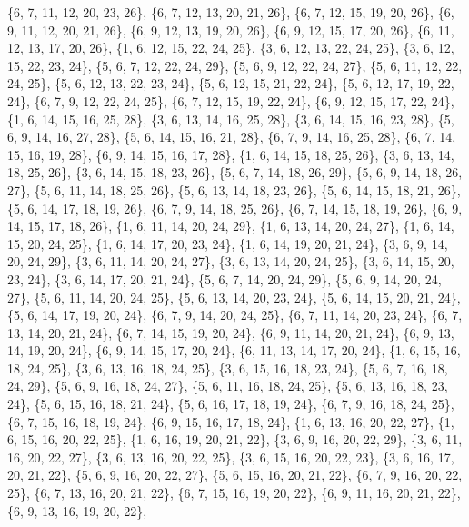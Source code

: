 \documentclass[11pt,a4paper]{article}
\begin{document}
{\{6, 7, 11, 12, 20, 23, 26\}, \{6, 7, 12, 13, 20, 21, 26\}, \{6, 7, 12, 15, 19, 20, 26\}, \{6, 9, 11, 12, 20, 21, 26\}, \{6, 9, 12, 13, 19, 20, 26\},
\{6, 9, 12, 15, 17, 20, 26\}, \{6, 11, 12, 13, 17, 20, 26\}, \{1, 6, 12, 15, 22, 24, 25\}, \{3, 6, 12, 13, 22, 24, 25\}, \{3, 6, 12, 15, 22, 23, 24\},
\{5, 6, 7, 12, 22, 24, 29\}, \{5, 6, 9, 12, 22, 24, 27\}, \{5, 6, 11, 12, 22, 24, 25\}, \{5, 6, 12, 13, 22, 23, 24\}, \{5, 6, 12, 15, 21, 22, 24\},
\{5, 6, 12, 17, 19, 22, 24\}, \{6, 7, 9, 12, 22, 24, 25\}, \{6, 7, 12, 15, 19, 22, 24\}, \{6, 9, 12, 15, 17, 22, 24\}, \{1, 6, 14, 15, 16, 25, 28\},
\{3, 6, 13, 14, 16, 25, 28\}, \{3, 6, 14, 15, 16, 23, 28\}, \{5, 6, 9, 14, 16, 27, 28\}, \{5, 6, 14, 15, 16, 21, 28\}, \{6, 7, 9, 14, 16, 25, 28\},
\{6, 7, 14, 15, 16, 19, 28\}, \{6, 9, 14, 15, 16, 17, 28\}, \{1, 6, 14, 15, 18, 25, 26\}, \{3, 6, 13, 14, 18, 25, 26\}, \{3, 6, 14, 15, 18, 23, 26\},
\{5, 6, 7, 14, 18, 26, 29\}, \{5, 6, 9, 14, 18, 26, 27\}, \{5, 6, 11, 14, 18, 25, 26\}, \{5, 6, 13, 14, 18, 23, 26\}, \{5, 6, 14, 15, 18, 21, 26\},
\{5, 6, 14, 17, 18, 19, 26\}, \{6, 7, 9, 14, 18, 25, 26\}, \{6, 7, 14, 15, 18, 19, 26\}, \{6, 9, 14, 15, 17, 18, 26\}, \{1, 6, 11, 14, 20, 24, 29\},
\{1, 6, 13, 14, 20, 24, 27\}, \{1, 6, 14, 15, 20, 24, 25\}, \{1, 6, 14, 17, 20, 23, 24\}, \{1, 6, 14, 19, 20, 21, 24\}, \{3, 6, 9, 14, 20, 24, 29\},
\{3, 6, 11, 14, 20, 24, 27\}, \{3, 6, 13, 14, 20, 24, 25\}, \{3, 6, 14, 15, 20, 23, 24\}, \{3, 6, 14, 17, 20, 21, 24\}, \{5, 6, 7, 14, 20, 24, 29\},
\{5, 6, 9, 14, 20, 24, 27\}, \{5, 6, 11, 14, 20, 24, 25\}, \{5, 6, 13, 14, 20, 23, 24\}, \{5, 6, 14, 15, 20, 21, 24\}, \{5, 6, 14, 17, 19, 20, 24\},
\{6, 7, 9, 14, 20, 24, 25\}, \{6, 7, 11, 14, 20, 23, 24\}, \{6, 7, 13, 14, 20, 21, 24\}, \{6, 7, 14, 15, 19, 20, 24\}, \{6, 9, 11, 14, 20, 21, 24\},
\{6, 9, 13, 14, 19, 20, 24\}, \{6, 9, 14, 15, 17, 20, 24\}, \{6, 11, 13, 14, 17, 20, 24\}, \{1, 6, 15, 16, 18, 24, 25\}, \{3, 6, 13, 16, 18, 24, 25\},
\{3, 6, 15, 16, 18, 23, 24\}, \{5, 6, 7, 16, 18, 24, 29\}, \{5, 6, 9, 16, 18, 24, 27\}, \{5, 6, 11, 16, 18, 24, 25\}, \{5, 6, 13, 16, 18, 23, 24\},
\{5, 6, 15, 16, 18, 21, 24\}, \{5, 6, 16, 17, 18, 19, 24\}, \{6, 7, 9, 16, 18, 24, 25\}, \{6, 7, 15, 16, 18, 19, 24\}, \{6, 9, 15, 16, 17, 18, 24\},
\{1, 6, 13, 16, 20, 22, 27\}, \{1, 6, 15, 16, 20, 22, 25\}, \{1, 6, 16, 19, 20, 21, 22\}, \{3, 6, 9, 16, 20, 22, 29\}, \{3, 6, 11, 16, 20, 22, 27\},
\{3, 6, 13, 16, 20, 22, 25\}, \{3, 6, 15, 16, 20, 22, 23\}, \{3, 6, 16, 17, 20, 21, 22\}, \{5, 6, 9, 16, 20, 22, 27\}, \{5, 6, 15, 16, 20, 21, 22\},
\{6, 7, 9, 16, 20, 22, 25\}, \{6, 7, 13, 16, 20, 21, 22\}, \{6, 7, 15, 16, 19, 20, 22\}, \{6, 9, 11, 16, 20, 21, 22\}, \{6, 9, 13, 16, 19, 20, 22\},
}
\end{document}
